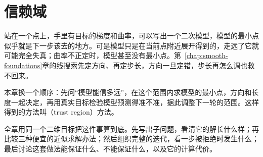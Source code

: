 \chapter{信赖域}
\label{chap:trust-region}

站在一个点上，手里有目标的梯度和曲率，可以写出一个二次模型，模型的最小点似乎就是下一步该去的地方。可是模型只是在当前点附近展开得到的，走远了它就可能完全失真；曲率不正定时，模型甚至没有最小点。第~\ref{chap:smooth-foundations}章的线搜索先定方向、再定步长，方向一旦定错，步长再怎么调也救不回来。

本章换一个顺序：先问“模型能信多远”，在这个范围内求模型的最小点，方向和长度一起决定，再用真实目标检验模型预测得准不准，据此调整下一轮的范围。这样得到的方法叫（trust region）方法。

全章用同一个二维目标把这件事算到底。先写出子问题，看清它的解长什么样；再比较三种便宜的近似求解办法；然后组织完整的迭代，看一步被拒绝时发生什么；最后讨论这套做法能保证什么、不能保证什么，以及它的计算代价。






